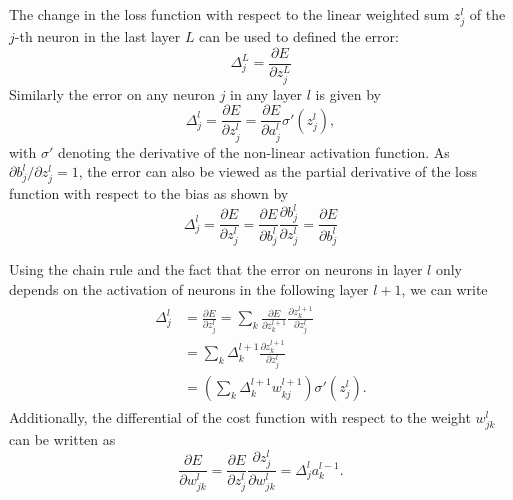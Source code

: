The change in the loss function with respect to the linear weighted sum $z^{l}_{j}$ of the $j$-th
neuron in the last layer $L$ can be used to defined the error:
\begin{equation} %
    \Delta^{L}_{j}=\frac{\partial E}{\partial z^{L}_{j}}
\end{equation}
Similarly the error on any neuron $j$ in any layer $l$ is given by
\begin{equation} %
    \Delta^{l}_{j}=\frac{\partial E}{\partial z^{l}_{j}}=\frac{\partial E}{\partial a^{l}_{j}}
    \sigma '(z^{l}_{j}),
    \label{eq:backprop_1}
\end{equation}
with $\sigma '$ denoting the derivative of the non-linear activation function. As $\partial
    b^{l}_{j}/\partial z^{l}_{j}=1$, the error can also be viewed as the partial derivative of the
loss function with respect to the bias as shown by
\begin{equation} %
    \Delta^{l}_{j}=\frac{\partial E}{\partial z^{l}_{j}}
    =\frac{\partial E}{\partial b^{l}_{j}}\frac{\partial b^{l}_{j}}{\partial z^{l}_{j}}
    =\frac{\partial E}{\partial b^{l}_{j}}
    \label{eq:backprop_2}
\end{equation}

Using the chain rule and the fact that the error on neurons in layer $l$ only depends on the
activation of neurons in the following layer $l+1$, we can write
\begin{align} %
    \begin{split}
        \Delta^{l}_{j} &=\frac{\partial E}{\partial z^{l}_{j}}
        =\sum_{k}\frac{\partial E}{\partial z^{l+1}_{k}}
        \frac{\partial z^{l+1}_{k}}{\partial z^{l}_{j}} \\
        &=\sum_{k}\Delta^{l+1}_{k}\frac{\partial z^{l+1}_{k}}{\partial z^{l}_{j}} \\
        &=\left(\sum_{k}\Delta^{l+1}_{k}w^{l+1}_{kj}\right)\sigma '(z^{l}_{j}).
    \end{split}
    \label{eq:backprop_3}
\end{align}
Additionally, the differential of the cost function with respect to the weight $w^{l}_{jk}$ can be
written as
\begin{equation} %
    \frac{\partial E}{\partial w^{l}_{jk}}
    =\frac{\partial E}{\partial z^{l}_{j}}\frac{\partial z^{l}_{j}}{\partial w^{l}_{jk}}
    =\Delta^{l}_{j}a^{l-1}_{k}.
    \label{eq:backprop_4}
\end{equation}


